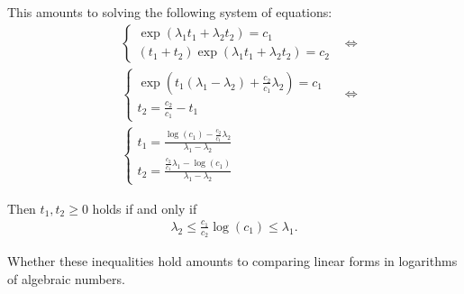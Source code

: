 This amounts to solving the following system of equations:
\begin{align*}
&\begin{cases}
\exp(\lambda_{1} t_{1} + \lambda_{2} t_{2}) = c_{1} \\
(t_{1} + t_{2}) \exp(\lambda_{1} t_{1} + \lambda_{2} t_{2}) = c_{2}
\end{cases}
&\Leftrightarrow \\
&\begin{cases}
\exp(t_{1} (\lambda_{1} - \lambda_{2}) + \frac{c_{2}}{c_{1}} \lambda_{2}) = c_{1} \\
t_{2} = \frac{c_{2}}{c_{1}} - t_{1}
\end{cases}
&\Leftrightarrow \\
&\begin{cases}
t_{1} = \frac{\log(c_{1}) - \frac{c_{2}}{c_{1}} \lambda_{2}}{\lambda_{1} - \lambda_{2}} \\
t_{2} = \frac{\frac{c_{2}}{c_{1}} \lambda_{1} - \log(c_{1})}{\lambda_{1} - \lambda_{2}}
\end{cases}
\end{align*}

Then $t_{1}, t_{2} \geq 0$ holds if and only if
\begin{align*}
\lambda_{2} \leq \frac{c_{1}}{c_{2}} \log(c_{1}) \leq \lambda_{1} .
\end{align*}

Whether these inequalities hold amounts to comparing linear forms in logarithms of algebraic numbers.
